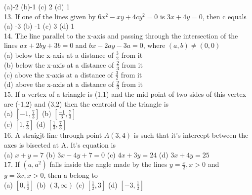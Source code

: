 \documentclass[12pt]{article}
\begin{document}
(a)-2 \hspace{1cm} (b)-1 \hspace{1cm} (c) 2 \hspace{1cm} (d) 1\\
13. If one of the lines given by $6x^2-xy+4cy^2=0$ is $3x+4y=0$, then c equals \\
(a) -3 \hspace{1cm} (b) -1 \hspace{1cm} (c)  3 \hspace{1cm} (d)  1\\
14. The line parallel to the x-axis and passing through the intersection of the lines $ax+2by+3b=0$ and $bx-2ay-3a=0$, where $(a,b) \neq (0,0)$\\
(a) below the x-axis at a distance of $\frac{3}{2}$ from it\\
(b) below the x-axis at a distance of $\frac{2}{3}$ from it\\
(c) above the x-axis at a distance of $\frac{3}{2}$ from it\\
(d) above the x-axis at a distance of $\frac{2}{3}$ from it\\
15. If a vertex of a triangle is (1,1) and the mid point of two sides of this vertex are (-1,2) and (3,2) then the centroid of the triangle is \\
(a) $\left[-1,\frac{7}{3}\right]$ \hspace{1cm}  (b) $\left[ \frac{-1}{3},\frac{7}{3}\right]$ \\
(c)  $\left[1,\frac{7}{3}\right]$  \hspace{1cm} (d)  $\left[ \frac{1}{3},\frac{7}{3}\right]$ \\
 16. A straigjt line through point $A(3,4)$ is such that it's intercept between the axes is bisected at A. It's equation is\\
(a)   $x+y=7$ \hspace{1cm} (b) $3x-4y+7=0$   \hspace{1cm} (c) $4x+3y=24$ \hspace{1cm}
(d) $3x+4y=25$\\
17. If $(a,a^2)$ falls inside the angle made by the lines $y= \frac{x}{2}, x>0$ and $y=3x, x>0$, then a belong to \\
(a) $\left[ 0,\frac{1}{2}\right] $ \hspace{1cm} (b) $(3,\infty)$ \hspace{1cm} (c) $\left[\frac{1}{2},3\right]$ \hspace{1cm} (d) $\left[-3,\frac{1}{2}\right]$\\
\end{document}
